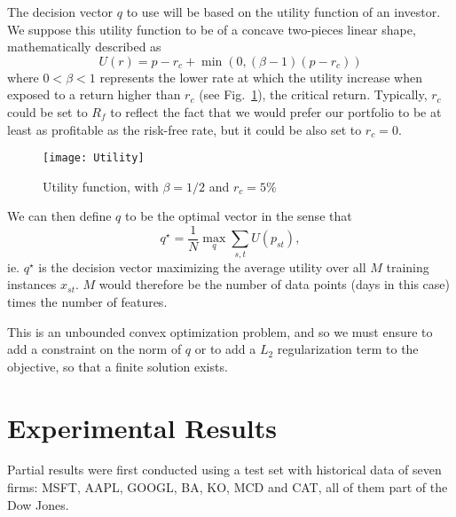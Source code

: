 \documentclass[11pt,fleqn]{article}
\newcommand{\figref}[1]{Fig.~\ref{#1}}
\begin{document}
The decision vector $q$ to use will be based on the utility function of an investor. We
suppose this utility function to be of a concave two-pieces linear shape, mathematically
described as 
\begin{equation*}
  U(r) = p-r_c + \min(0,(\beta-1)(p-r_c))
\end{equation*}
where $0<\beta<1$ represents the lower rate at which the utility increase when exposed to
a return higher than $r_c$ (see \figref{fig:utility}), the critical return. Typically,
$r_c$ could be set to $R_f$ to reflect the fact that we would prefer our portfolio to be
at least as profitable as the risk-free rate, but it could be also set to $r_c=0$.

\begin{figure}
  \centering
  \texttt{[image: Utility]}
  \caption{Utility function, with $\beta=1/2$ and $r_c=5\%$}
  \label{fig:utility}
\end{figure}

We can then define $q$ to be the optimal vector in the sense that
\begin{equation*}
  q^\star = \frac{1}{N} \max_q \sum_{s,t} U(p_{st}),
\end{equation*}
ie. $q^\star$ is the decision vector maximizing the average utility over all $M$ training
instances $x_{st}$. $M$ would therefore be the number of data points (days in this case)
times the number of features.

This is an unbounded convex optimization problem, and so we must ensure to add a
constraint on the norm of $q$ or to add a $L_2$ regularization term to the objective, so
that a finite solution exists.



\section{Experimental Results}

Partial results were first conducted using a test set with historical data of seven firms:
MSFT, AAPL, GOOGL, BA, KO, MCD and CAT, all of them part of the Dow Jones.
\end{document}
